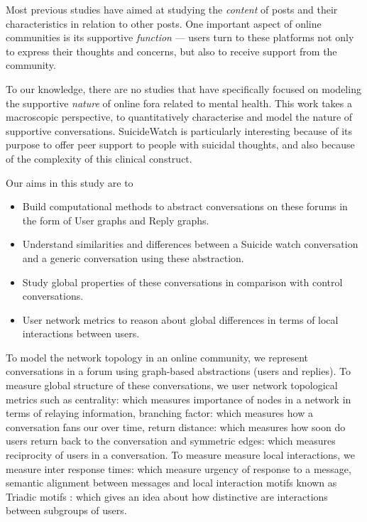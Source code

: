 Most previous studies have aimed at studying the \emph{content} of posts and their characteristics in relation to other posts. One important aspect of online communities is its supportive \emph{function} --- users turn to these platforms not only to express their thoughts and concerns, but also to receive support from the community. 

To our knowledge, there are no studies that have specifically focused on modeling the supportive \emph{nature} of online fora related to mental health. This work takes a macroscopic perspective, to quantitatively characterise and model the nature of supportive conversations. SuicideWatch is particularly interesting because of its purpose to offer peer support to people with suicidal thoughts, and also because of the complexity of this clinical construct.

Our aims in this study are to 
\begin{itemize}
    \item Build computational methods to abstract conversations on these forums in the form of User graphs and Reply graphs. 
    \item Understand similarities and differences between a Suicide watch conversation and a generic conversation using these abstraction. 
    \item Study global properties of these conversations in comparison with control conversations. 
    \item User network metrics to reason about global differences in terms of local interactions between users. 
\end{itemize}
 
    
To model the network topology in an online community, we represent conversations in a forum using graph-based abstractions (users and replies). 
To measure global structure of these conversations, we user network topological metrics such as centrality: which measures importance of nodes in a network in terms of relaying information, branching factor: which measures how a conversation fans our over time, return distance: which measures how soon do users return back to the conversation and symmetric edges: which measures reciprocity of users in a conversation. To measure measure local interactions, we measure inter response times: which measure urgency of response to a message, semantic alignment between messages and local interaction motifs known as Triadic motifs : which gives an idea about how distinctive are interactions between subgroups of users. 

